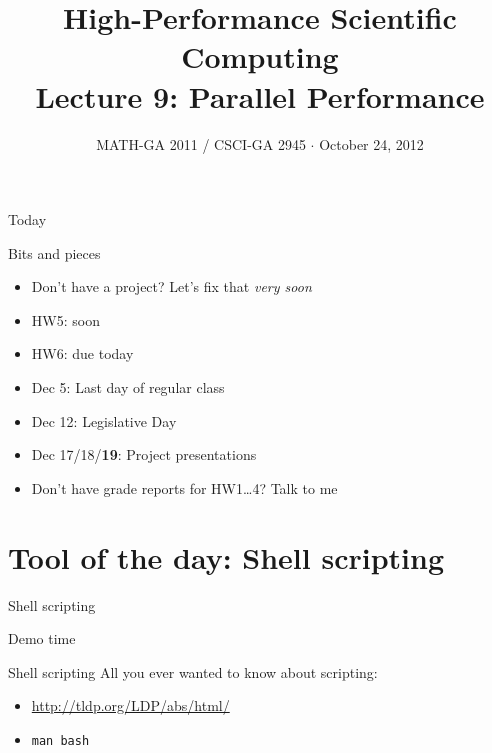 \documentclass[english,compress]{beamer}
\begin{document}

\title{High-Performance Scientific Computing\\Lecture 9: Parallel Performance}

\date{MATH-GA 2011 / CSCI-GA 2945 $\cdot$ October 24, 2012}

\frame{\titlepage}

\begin{frame}{Today}
  \tableofcontents[hideallsubsections]
\end{frame}
\begin{frame}{Bits and pieces}
  \begin{itemize}
    \item Don't have a project? Let's fix that \emph{very soon}
    \item HW5: soon
    \item HW6: due today
    \item Dec 5: Last day of regular class
    \item Dec 12: Legislative Day
    \item Dec 17/18/\textbf{19}: Project presentations
    \item Don't have grade reports for HW1\dots4? Talk to me
  \end{itemize}
\end{frame}
\section[Software]{Tool of the day: Shell scripting}
\begin{frame}{Shell scripting}
  \begin{center}
  \Huge Demo time
  \end{center}
\end{frame}
\begin{frame}{Shell scripting}
  \Large
  All you ever wanted to know about scripting:

  \begin{itemize}
    \item \url{http://tldp.org/LDP/abs/html/}
    \item \texttt{man bash}
  \end{itemize}
\end{frame}
\end{document}
